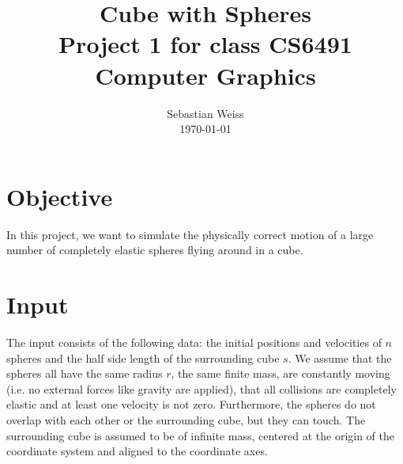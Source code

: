 \documentclass[journal, letterpaper]{IEEEtran}
\begin{document}
\title{Cube with Spheres \\
	{\large Project 1 for class CS6491 Computer Graphics}}
\author{Sebastian Weiss \\ \today}

\maketitle


\section{Objective}
In this project, we want to simulate the physically correct motion of a large number of completely elastic spheres flying around in a cube.

\section{Input}
The input consists of the following data: the initial positions and velocities of $n$ spheres and the half side length of the surrounding cube $s$.
We assume that the spheres all have the same radius $r$, the same finite mass, are constantly moving (i.e. no external forces like gravity are applied), that all collisions are completely elastic and at least one velocity is not zero. Furthermore, the spheres do not overlap with each other or the surrounding cube, but they can touch. The surrounding cube is assumed to be of infinite mass, centered at the origin of the coordinate system and aligned to the coordinate axes.
\end{document}
